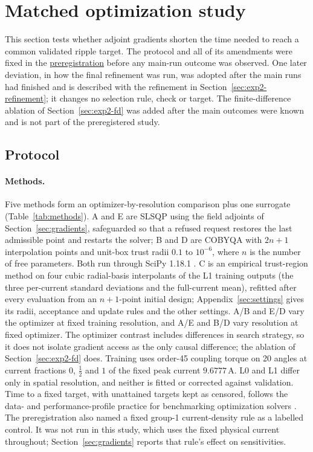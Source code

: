 \section{Matched optimization study}\label{sec:optimization}
This section tests whether adjoint gradients shorten the time needed to
reach a common validated ripple target. The protocol and all of
its amendments were fixed in the
\href{https://github.com/rjwalters/geode-fem/issues/1185}{preregistration}
before any main-run outcome was observed. One later deviation, in how the
final refinement was run, was adopted after the main runs had finished and
is described with the refinement in Section~\ref{sec:exp2-refinement}; it
changes no selection rule, check or target. The finite-difference ablation
of Section~\ref{sec:exp2-fd} was added after the main outcomes were known
and is not part of the preregistered study.

\subsection{Protocol}
\paragraph{Methods.}
Five methods form an optimizer-by-resolution comparison plus one
surrogate (Table~\ref{tab:methods}). A and E are SLSQP
\citep{kraft1988} using the field adjoints of Section~\ref{sec:gradients},
safeguarded so that a refused request restores the last admissible point
and restarts the solver; B and D are COBYQA \citep{ragonneau2022} with $2n+1$ interpolation points
and unit-box trust radii $0.1$ to $10^{-6}$, where $n$ is the number of free
parameters. Both run through SciPy 1.18.1 \citep{virtanen2020scipy}. C is
an empirical trust-region method on four cubic radial-basis interpolants
of the L1 training outputs (the three per-current standard deviations and
the full-current mean), refitted after every evaluation from an $n+1$-point
initial design; Appendix~\ref{sec:settings} gives its radii, acceptance
and update rules and the other settings. A/B and E/D vary the optimizer at fixed training resolution,
and A/E and B/D vary resolution at fixed optimizer. The optimizer contrast
includes differences in search strategy, so it does not isolate gradient
access as the only causal difference; the ablation of
Section~\ref{sec:exp2-fd} does. Training uses order-45 coupling torque
on 20 angles at current fractions $0$, $\tfrac12$ and $1$ of the fixed peak
current $9.6777\,\mathrm{A}$. L0 and L1 differ only in spatial resolution,
and neither is fitted or corrected against validation. Time to a fixed
target, with unattained targets kept as censored, follows the data- and performance-profile
practice for benchmarking optimization solvers \citep{more2009benchmarking,dolan2002benchmarking}.
The preregistration also named a fixed group-1 current-density rule as a
labelled control. It was not run in this study, which uses the fixed
physical current throughout; Section~\ref{sec:gradients} reports that
rule's effect on sensitivities.

